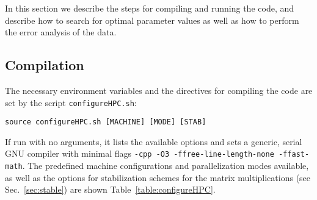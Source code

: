 


In this section we describe the steps for compiling and running the code, and describe how to search for optimal parameter values as well as how to perform the error analysis of the data.

\subsection{Compilation}
\label{sec:compilation}

The necessary environment variables and the directives for compiling the code are set by the script \texttt{configureHPC.sh}:
\begin{lstlisting}[style=bash]
source configureHPC.sh [MACHINE] [MODE] [STAB]
\end{lstlisting}
If run with no arguments, it lists the available options and sets a generic, serial GNU compiler with minimal flags \texttt{-cpp -O3 -ffree-line-length-none -ffast-math}. The predefined machine configurations and parallelization modes available, as well as the options for stabilization schemes for the matrix multiplications (see Sec.~\ref{sec:stable}) are shown Table~\ref{table:configureHPC}.

